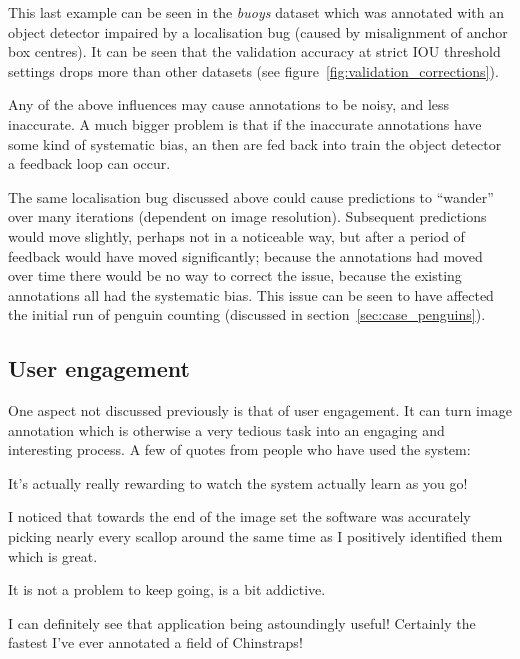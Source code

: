This last example can be seen in the \emph{buoys} dataset which was annotated with an object detector impaired by a localisation bug (caused by misalignment of anchor box centres). It can be seen that the validation accuracy at strict \gls{IOU} threshold settings drops more than other datasets (see figure~\ref{fig:validation_corrections}).   

Any of the above influences may cause annotations to be noisy, and less inaccurate. A much bigger problem is that if the inaccurate annotations have some kind of systematic bias, an then are fed back into train the object detector a feedback loop can occur. 

The same localisation bug discussed above could cause predictions to ``wander'' over many iterations (dependent on image resolution). Subsequent predictions would move slightly, perhaps not in a noticeable way, but after a period of feedback would have moved significantly; because the annotations had moved over time there would be no way to correct the issue, because the existing annotations all had the systematic bias. This issue can be seen to have affected the initial run of penguin counting (discussed in section~\ref{sec:case_penguins}).   

\subsection{User engagement}
\label{sec:engagement}

One aspect not discussed previously is that of user engagement. It can turn image annotation which is otherwise a very tedious task into an engaging and interesting process. A few of quotes from people who have used the system:

\begin{displayquote}
It's actually really rewarding to watch the system actually learn as you go!
\end{displayquote}

\begin{displayquote}
I noticed that towards the end of the image set the software was accurately picking nearly every scallop around the same time as I positively identified them which is great.
\end{displayquote}

\begin{displayquote}
 It is not a problem to keep going, is a bit addictive.
\end{displayquote}

\begin{displayquote}
I can definitely see that application being astoundingly useful! Certainly the fastest I've ever annotated a field of Chinstraps! 
\end{displayquote}

